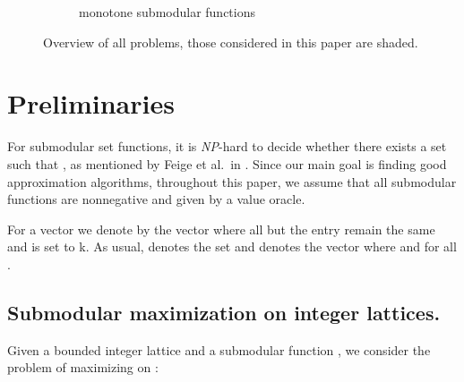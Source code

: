 \documentclass{article}
\newcommand{\NP}{\mbox{\slshape NP}}
\theoremstyle{plain}
\theoremstyle{definition}
\begin{document}
\begin{figure}[tb]
\begin{subfigure}{\textwidth}
 \caption{monotone submodular functions}
 \end{subfigure}

\caption{Overview of all problems, those considered in this paper are shaded. 
}\label{fig:SM-overview}
\end{figure}



\section{Preliminaries}\label{sec:preliminaries}
For submodular set functions, it is \NP-hard to decide
whether there exists a set  such that , as mentioned by Feige et al.\ in \cite{LocalSearch}. 
Since our main goal is finding good approximation algorithms, 
throughout this paper, we assume that all submodular functions are nonnegative and given by a value oracle. 


For a vector  we denote by  the vector where all 
but the entry  remain the same and  is set to k.
As usual,  denotes the set  and  
denotes the vector where  and  for all .

\subsection{Submodular maximization on integer lattices.}
Given a bounded integer lattice  
and a submodular function 
, 
we consider the problem of maximizing  on :
\end{document}
